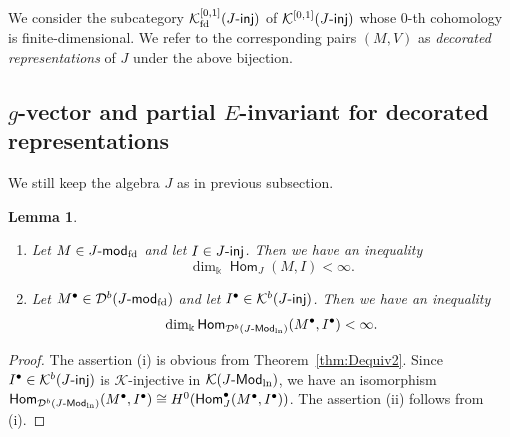 \documentclass[12pt]{amsart}
\newtheorem{lemma}[theorem]{Lemma}
\theoremstyle{definition}
\theoremstyle{remark}
\numberwithin{equation}{section}
\def\Dcal{\mathcal{D}}
\newcommand{\opname}[1]{\operatorname{\mathsf{#1}}}
\newcommand{\Hom}{\opname{Hom}}
\newcommand{\injc}{\mathchar`-\mathsf{inj}}
\newcommand{\cK}{\mathcal{K}}
\newcommand{\Modln}{\mathchar`-\mathsf{Mod}_{\mathrm{ln}}}
\newcommand{\modfd}{\mathchar`-\mathsf{mod}_{\mathrm{fd}}}
\begin{document}
 We consider the subcategory $\cK_{\rm fd}^{[0, 1]}(J\injc)$ of $\cK^{[0, 1]}(J\injc)$ whose $0$-th cohomology is finite-dimensional. We refer to the corresponding pairs $(M,V)$ as \emph{decorated representations} of $J$ under the above bijection.

\subsection{$g$-vector and partial $E$-invariant for decorated representations}
 We still keep the algebra $J$ as in previous subsection. 
\begin{lemma}\label{lem:fdHom}
    \begin{enumerate}
        \item[(i)] Let $M\in J\modfd$ and let $I\in J\injc$. Then we have an inequality \[\dim_{\Bbbk }\Hom_J(M, I)<\infty.\]
        \item[(ii)] Let $M^\bullet\in \Dcal^b(J\modfd)$ and let $I^\bullet\in \cK^b(J\injc)$. Then we have an inequality \[\dim_{\Bbbk }\Hom_{\Dcal^b(J\Modln)}(M^\bullet, I^\bullet)<\infty.\]
    \end{enumerate}
 \end{lemma}
 \begin{proof}
    The assertion (i) is obvious from Theorem~\ref{thm:Dequiv2}.
Since $I^\bullet\in \cK^b(J\injc)$ is $\cK$-injective in $\mathcal{K}(J\Modln)$, we have an isomorphism $\Hom_{\Dcal^b(J\Modln)}(M^\bullet, I^\bullet)\cong H^0(\Hom^\bullet_J(M^\bullet, I^\bullet))$. The assertion (ii) follows from (i).
 \end{proof}
 
\end{document}
